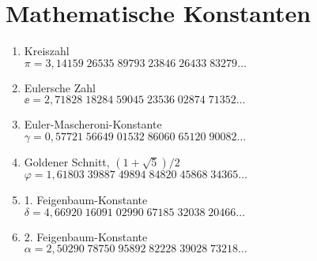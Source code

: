 \vspace{2em}
\section{Mathematische Konstanten}
\begin{enumerate}
\item Kreiszahl\\
$\pi = 3{,}14159\;26535\;89793\;23846\;26433\;83279\ldots$

\item Eulersche Zahl\\
$\ee = 2{,}71828\;18284\;59045\;23536\;02874\;71352\ldots$

\item Euler-Mascheroni-Konstante\\
$\gamma = 0{,}57721\;56649\;01532\;86060\;65120\;90082\ldots$

\item Goldener Schnitt, $(1+\sqrt{5})/2$\\
$\varphi = 1{,}61803\;39887\;49894\;84820\;45868\;34365\ldots$

\item 1. Feigenbaum-Konstante\\
$\delta = 4{,}66920\;16091\;02990\;67185\;32038\;20466\ldots$

\item 2. Feigenbaum-Konstante\\
$\alpha = 2{,}50290\;78750\;95892\;82228\;39028\;73218\ldots$
\end{enumerate}

\newpage
